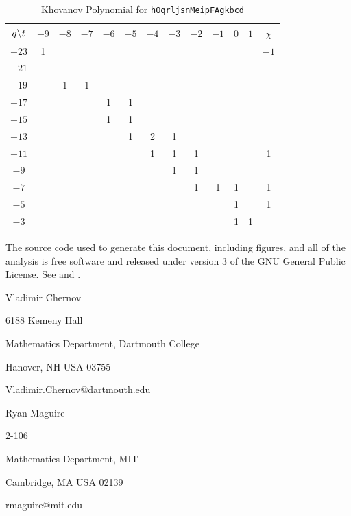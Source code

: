 \documentclass{article}
\theoremstyle{plain}
\begin{document}
        \begin{table}
            \centering
            \begin{tabular}{| c | c | c | c | c | c | c | c | c | c | c | c | c |}
                \hline
                $q\symbol{92}t$&$-9$&$-8$&$-7$&$-6$&$-5$&$-4$&$-3$&$-2$&$-1$&$0$&$1$&$\chi$\\
                \hline
                $-23$&1&&&&&&&&&&&$-1$\\
                \hline
                $-21$&&&&&&&&&&&&\\
                \hline
                $-19$&&1&1&&&&&&&&&\\
                \hline
                $-17$&&&&1&1&&&&&&&\\
                \hline
                $-15$&&&&1&1&&&&&&&\\
                \hline
                $-13$&&&&&1&2&1&&&&&\\
                \hline
                $-11$&&&&&&1&1&1&&&&1\\
                \hline
                $-9$&&&&&&&1&1&&&&\\
                \hline
                $-7$&&&&&&&&1&1&1&&1\\
                \hline
                $-5$&&&&&&&&&&1&&1\\
                \hline
                $-3$&&&&&&&&&&1&1&\\
                \hline
            \end{tabular}
            \caption{Khovanov Polynomial for \texttt{hOqrljsnMeipFAgkbcd}}
        \end{table}
    \newpage
    
    
    \newpage
    The source code used to generate this document, including figures, and all
    of the analysis is free software and released under version 3 of the
    GNU General Public License. See
    \cite{MaguireMathematicsAndPhysics} and \cite{MaguireLibtmpl}.
    \par\hfill\par
    Vladimir Chernov
    \par
    6188 Kemeny Hall
    \par
    Mathematics Department, Dartmouth College
    \par
    Hanover, NH USA 03755
    \par
    Vladimir.Chernov@dartmouth.edu
    \par\hfill\par
    Ryan Maguire
    \par
    2-106
    \par
    Mathematics Department, MIT
    \par
    Cambridge, MA USA 02139
    \par
    rmaguire@mit.edu
\end{document}
